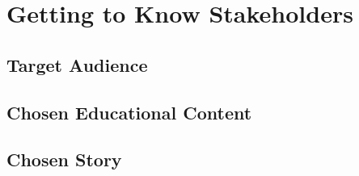 
\section{Getting to Know Stakeholders}
\subsection{Target Audience}

\subsection{Chosen Educational Content}

\subsection{Chosen Story}
